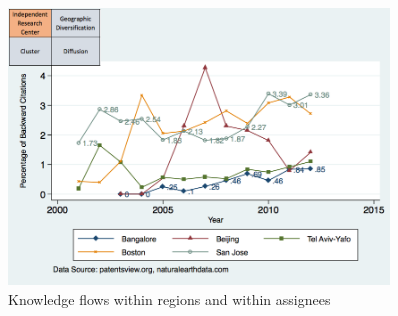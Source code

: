 \documentclass[12pt,letterpaper]{article}
\begin{document}
\begin{figure}[h]
\begin{centering}
  \includegraphics[width=0.90\textwidth]{SMSSameRegionSameAssigneeFlows}
  \caption{Knowledge flows within regions and within assignees}
  \label{fig:SMSSameRegionSameAssigneeFlows}
\end{centering}
\end{figure}
\end{document}
